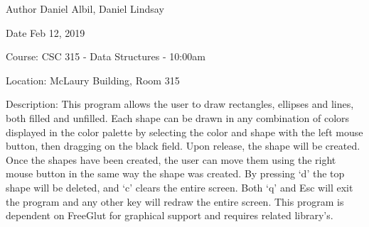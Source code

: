 \begin{DoxyAuthor}{Author}
Daniel Albil, Daniel Lindsay
\end{DoxyAuthor}
\begin{DoxyDate}{Date}
Feb 12, 2019
\end{DoxyDate}
\begin{DoxyParagraph}{Course\+:}
C\+SC 315 -\/ Data Structures -\/ 10\+:00am
\end{DoxyParagraph}
\begin{DoxyParagraph}{Location\+:}
Mc\+Laury Building, Room 315
\end{DoxyParagraph}
\begin{DoxyParagraph}{Description\+:}
This program allows the user to draw rectangles, ellipses and lines, both filled and unfilled. Each shape can be drawn in any combination of colors displayed in the color palette by selecting the color and shape with the left mouse button, then dragging on the black field. Upon release, the shape will be created. Once the shapes have been created, the user can move them using the right mouse button in the same way the shape was created. By pressing ‘d’ the top shape will be deleted, and ‘c’ clears the entire screen. Both ‘q’ and Esc will exit the program and any other key will redraw the entire screen. This program is dependent on Free\+Glut for graphical support and requires related library’s. 
\end{DoxyParagraph}
